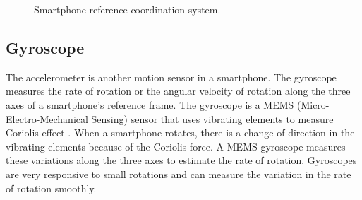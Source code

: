 \begin{figure}[!ht]
\centering
{}
\hfill
{}

\caption{Smartphone reference coordination system.}
\label{f:coord_dia}
\end{figure}

\subsection{Gyroscope}
The accelerometer is another motion sensor in a smartphone.
The gyroscope measures the rate of rotation or the angular velocity of rotation along the three axes of a smartphone's reference frame.
The gyroscope is a MEMS (Micro-Electro-Mechanical Sensing) sensor that uses vibrating elements to measure Coriolis effect .
When a smartphone rotates, there is a change of direction in the vibrating elements because of the Coriolis force.
A MEMS gyroscope measures these variations along the three axes to estimate the rate of rotation.
Gyroscopes are very responsive to small rotations and can measure the variation in the rate of rotation smoothly.

